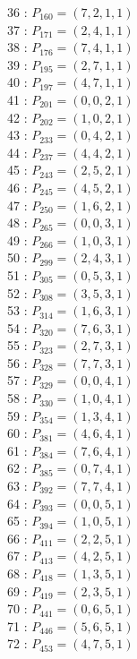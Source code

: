 \documentclass{article}
\begin{document}
{\begin{multicols}{3}
36 : $P_{160}=( 7, 2, 1, 1 )$\\
37 : $P_{171}=( 2, 4, 1, 1 )$\\
38 : $P_{176}=( 7, 4, 1, 1 )$\\
39 : $P_{195}=( 2, 7, 1, 1 )$\\
40 : $P_{197}=( 4, 7, 1, 1 )$\\
41 : $P_{201}=( 0, 0, 2, 1 )$\\
42 : $P_{202}=( 1, 0, 2, 1 )$\\
43 : $P_{233}=( 0, 4, 2, 1 )$\\
44 : $P_{237}=( 4, 4, 2, 1 )$\\
45 : $P_{243}=( 2, 5, 2, 1 )$\\
46 : $P_{245}=( 4, 5, 2, 1 )$\\
47 : $P_{250}=( 1, 6, 2, 1 )$\\
48 : $P_{265}=( 0, 0, 3, 1 )$\\
49 : $P_{266}=( 1, 0, 3, 1 )$\\
50 : $P_{299}=( 2, 4, 3, 1 )$\\
51 : $P_{305}=( 0, 5, 3, 1 )$\\
52 : $P_{308}=( 3, 5, 3, 1 )$\\
53 : $P_{314}=( 1, 6, 3, 1 )$\\
54 : $P_{320}=( 7, 6, 3, 1 )$\\
55 : $P_{323}=( 2, 7, 3, 1 )$\\
56 : $P_{328}=( 7, 7, 3, 1 )$\\
57 : $P_{329}=( 0, 0, 4, 1 )$\\
58 : $P_{330}=( 1, 0, 4, 1 )$\\
59 : $P_{354}=( 1, 3, 4, 1 )$\\
60 : $P_{381}=( 4, 6, 4, 1 )$\\
61 : $P_{384}=( 7, 6, 4, 1 )$\\
62 : $P_{385}=( 0, 7, 4, 1 )$\\
63 : $P_{392}=( 7, 7, 4, 1 )$\\
64 : $P_{393}=( 0, 0, 5, 1 )$\\
65 : $P_{394}=( 1, 0, 5, 1 )$\\
66 : $P_{411}=( 2, 2, 5, 1 )$\\
67 : $P_{413}=( 4, 2, 5, 1 )$\\
68 : $P_{418}=( 1, 3, 5, 1 )$\\
69 : $P_{419}=( 2, 3, 5, 1 )$\\
70 : $P_{441}=( 0, 6, 5, 1 )$\\
71 : $P_{446}=( 5, 6, 5, 1 )$\\
72 : $P_{453}=( 4, 7, 5, 1 )$\\

\end{multicols}}
\end{document}
